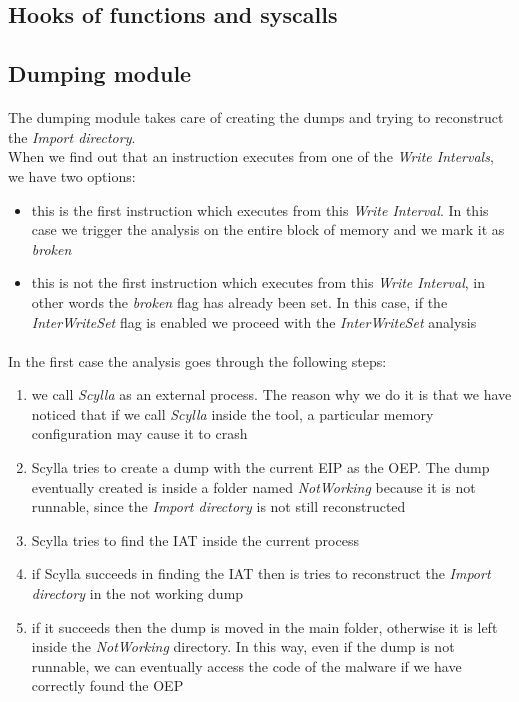 \subsection{Hooks of functions and syscalls}
\label{Hooks of functions and syscalls}

\subsection{Dumping module}
\label{Dumping module}
\paragraph{}
The dumping module takes care of creating the dumps and trying to reconstruct the \textit{Import directory}.\\
When we find out that an instruction executes from one of the \textit{Write Intervals}, we have two options:
\begin{itemize}
\item this is the first instruction which executes from this \textit{Write Interval}. In this case we trigger the analysis on the entire block of memory and we mark it as \textit{broken}
\item this is not the first instruction which executes from this \textit{Write Interval}, in other words the \textit{broken} flag has already been set. In this case, if the \textit{InterWriteSet} flag is enabled we proceed with the \textit{InterWriteSet} analysis
\end{itemize}
\paragraph{}
In the first case the analysis goes through the following steps:
\begin{enumerate}
\item we call \textit{Scylla} as an external process. The reason why we do it is that we have noticed that if we call \textit{Scylla} inside the tool, a particular memory configuration may cause it to crash
\item Scylla tries to create a dump with the current EIP as the OEP. The dump eventually created is inside a folder named \textit{NotWorking} because it is not runnable, since the \textit{Import directory} is not still reconstructed
\item Scylla tries to find the IAT inside the current process
\item if Scylla succeeds in finding the IAT then is tries to reconstruct the \textit{Import directory} in the not working dump
\item if it succeeds then the dump is moved in the main folder, otherwise it is left inside the \textit{NotWorking} directory. In this way, even if the dump is not runnable, we can eventually access the code of the malware if we have correctly found the OEP
\end{enumerate} 
